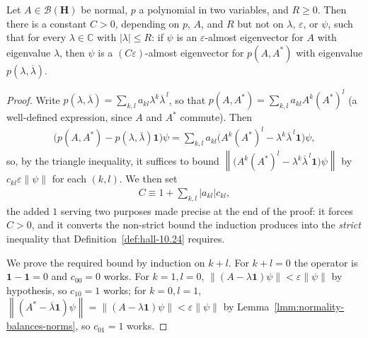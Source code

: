 \begin{lemma}
    \label{lmm:hall-10.26}
    \leanok
    Let $A \in \mathcal{B}(\mathbf{H})$ be normal, $p$ a polynomial in two variables, and $R \ge 0$. Then there is a constant $C > 0$, depending on $p$, $A$, and $R$ but not on $\lambda$, $\varepsilon$, or $\psi$, such that for every $\lambda \in \mathbb{C}$ with $\lvert \lambda \rvert \le R$: if $\psi$ is an $\varepsilon$-almost eigenvector for $A$ with eigenvalue $\lambda$, then $\psi$ is a $(C\varepsilon)$-almost eigenvector for $p(A,A^*)$ with eigenvalue $p(\lambda,\overline\lambda)$.
\end{lemma}
\begin{proof}
    \leanok
Write $p(\lambda,\overline\lambda) = \sum_{k,l} a_{kl}\lambda^k\overline\lambda^{\,l}$, so that $p(A,A^*) = \sum_{k,l} a_{kl}A^k(A^*)^l$ (a well-defined expression, since $A$ and $A^*$ commute). Then
\begin{align}
    \big( p(A,A^*) - p(\lambda,\overline\lambda)\mathbf{1} \big)\psi = \sum_{k,l} a_{kl}\big( A^k(A^*)^l - \lambda^k\overline\lambda^{\,l}\mathbf{1} \big)\psi,
\end{align}
so, by the triangle inequality, it suffices to bound $\left\| \big( A^k(A^*)^l - \lambda^k\overline\lambda^{\,l}\mathbf{1} \big)\psi \right\|$ by $c_{kl}\varepsilon\left\| \psi \right\|$ for each $(k,l)$. We then set
\begin{align}
    C \equiv 1 + \sum_{k,l} \lvert a_{kl} \rvert c_{kl},
\end{align}
the added $1$ serving two purposes made precise at the end of the proof: it forces $C > 0$, and it converts the non-strict bound the induction produces into the \textit{strict} inequality that Definition~\ref{def:hall-10.24} requires.

We prove the required bound by induction on $k+l$. For $k+l = 0$ the operator is $\mathbf{1} - \mathbf{1} = 0$ and $c_{00}=0$ works. For $k=1, l=0$, $\left\| (A-\lambda\mathbf{1})\psi \right\| < \varepsilon\left\| \psi \right\|$ by hypothesis, so $c_{10}=1$ works; for $k=0,l=1$, $\left\| (A^*-\overline\lambda\mathbf{1})\psi \right\| = \left\| (A-\lambda\mathbf{1})\psi \right\| < \varepsilon\left\| \psi \right\|$ by Lemma~\ref{lmm:normality-balances-norms}, so $c_{01}=1$ works.


\end{proof}
